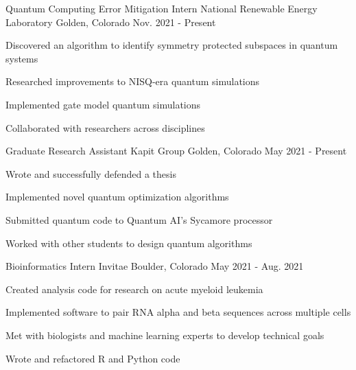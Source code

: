 

\begin{cventries}

  \cventry
    {Quantum Computing Error Mitigation Intern}
    {National Renewable Energy Laboratory}
    {Golden, Colorado}
    {Nov. 2021 - Present}
    {
      \begin{cvitems}
        \item {Discovered an algorithm to identify symmetry protected subspaces in quantum systems}
        \item {Researched improvements to NISQ-era quantum simulations}
        \item {Implemented gate model quantum simulations}
        \item {Collaborated with researchers across disciplines}
      \end{cvitems}
    }

  \cventry
    {Graduate Research Assistant}
    {Kapit Group}
    {Golden, Colorado}
    {May 2021 - Present}
    {
      \begin{cvitems}
        \item {Wrote and successfully defended a thesis}
        \item {Implemented novel quantum optimization algorithms}
        \item {Submitted quantum code to Quantum AI's Sycamore processor}
        \item {Worked with other students to design quantum algorithms}
      \end{cvitems}
    }

  \cventry
    {Bioinformatics Intern}
    {Invitae}
    {Boulder, Colorado}
    {May 2021 - Aug. 2021}
    {
      \begin{cvitems}
        \item {Created analysis code for research on acute myeloid leukemia}
        \item {Implemented software to pair RNA alpha and beta sequences across multiple cells}
        \item {Met with biologists and machine learning experts to develop technical goals}
        \item {Wrote and refactored R and Python code}
      \end{cvitems}
    }
    

\end{cventries}
